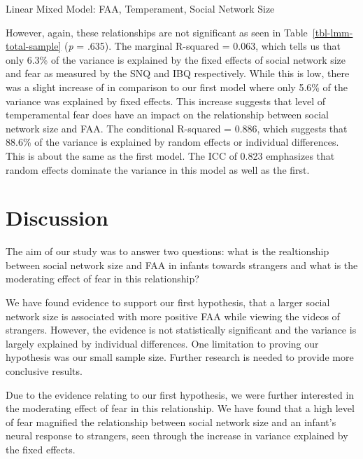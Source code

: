 \documentclass[
  man,
  floatsintext,
  longtable,
  nolmodern,
  notxfonts,
  notimes,
  colorlinks=true,linkcolor=blue,citecolor=blue,urlcolor=blue]{apa7}
\begin{document}
\begin{table}

{\caption{{Linear Mixed Model: FAA, Temperament, Social Network
Size}{\label{tbl-lmm-total-sample}}}
\vspace{-20pt}}

\end{table}

However, again, these relationships are not significant as seen in
Table~\ref{tbl-lmm-total-sample} (\emph{p} = .635). The marginal
R-squared = 0.063, which tells us that only 6.3\% of the variance is
explained by the fixed effects of social network size and fear as
measured by the SNQ and IBQ respectively. While this is low, there was a
slight increase of in comparison to our first model where only 5.6\% of
the variance was explained by fixed effects. This increase suggests that
level of temperamental fear does have an impact on the relationship
between social network size and FAA. The conditional R-squared = 0.886,
which suggests that 88.6\% of the variance is explained by random
effects or individual differences. This is about the same as the first
model. The ICC of 0.823 emphasizes that random effects dominate the
variance in this model as well as the first.

\section{Discussion}\label{sec-discussion}

The aim of our study was to answer two questions: what is the
realtionship between social network size and FAA in infants towards
strangers and what is the moderating effect of fear in this
relationship?

We have found evidence to support our first hypothesis, that a larger
social network size is associated with more positive FAA while viewing
the videos of strangers. However, the evidence is not statistically
significant and the variance is largely explained by individual
differences. One limitation to proving our hypothesis was our small
sample size. Further research is needed to provide more conclusive
results.

Due to the evidence relating to our first hypothesis, we were further
interested in the moderating effect of fear in this relationship. We
have found that a high level of fear magnified the relationship between
social network size and an infant's neural response to strangers, seen
through the increase in variance explained by the fixed effects.
\end{document}
